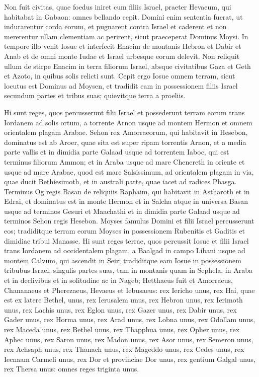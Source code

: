 \begin{biblechapter}
\verse Non fuit civitas, quae foedus iniret cum filiis Israel, praeter Hevaeum, qui habitabat in Gabaon: omnes bellando cepit. 
\verse Domini enim sententia fuerat, ut indurarentur corda eorum, et pugnarent contra Israel et caderent et non mererentur ullam clementiam ac perirent, sicut praeceperat Dominus Moysi. 
\verse In tempore illo venit Iosue et interfecit Enacim de montanis Hebron et Dabir et Anab et de omni monte Iudae et Israel urbesque eorum delevit. 
\verse Non reliquit ullum de stirpe Enacim in terra filiorum Israel, absque civitatibus Gaza et Geth et Azoto, in quibus solis relicti sunt. 
\verse Cepit ergo Iosue omnem terram, sicut locutus est Dominus ad Moysen, et tradidit eam in possessionem filiis Israel secundum partes et tribus suas; quievitque terra a proeliis. 
\end{biblechapter}

\begin{biblechapter}  
\verse Hi sunt reges, quos percusserunt filii Israel et possederunt terram eorum trans Iordanem ad solis ortum, a torrente Arnon usque ad montem Hermon et omnem orientalem plagam Arabae. 
\verse Sehon rex Amorraeorum, qui habitavit in Hesebon, dominatus est ab Aroer, quae sita est super ripam torrentis Arnon, et a media parte vallis et in dimidia parte Galaad usque ad torrentem Iaboc, qui est terminus filiorum Ammon; 
\verse et in Araba usque ad mare Chenereth in oriente et usque ad mare Arabae, quod est mare Salsissimum, ad orientalem plagam in via, quae ducit Bethiesimoth, et in australi parte, quae iacet ad radices Phasga. 
\verse Terminus Og regis Basan de reliquiis Raphaim, qui habitavit in Astharoth et in Edrai, 
\verse et dominatus est in monte Hermon et in Salcha atque in universa Basan usque ad terminos Gesuri et Maachathi et in dimidia parte Galaad usque ad terminos Sehon regis Hesebon. 
\verse Moyses famulus Domini et filii Israel percusserunt eos; tradiditque terram eorum Moyses in possessionem Rubenitis et Gaditis et dimidiae tribui Manasse. 
\verse Hi sunt reges terrae, quos percussit Iosue et filii Israel trans Iordanem ad occidentalem plagam, a Baalgad in campo Libani usque ad montem Calvum, qui ascendit in Seir; tradiditque eam Iosue in possessionem tribubus Israel, singulis partes suas, 
\verse tam in montanis quam in Sephela, in Araba et in declivibus et in solitudine ac in Nageb; Hetthaeus fuit et Amorraeus, Chananaeus et Pherezaeus, Hevaeus et Iebusaeus: 
\verse rex Iericho unus, rex Hai, quae est ex latere Bethel, unus, 
\verse rex Ierusalem unus, rex Hebron unus, 
\verse rex Ierimoth unus, rex Lachis unus, 
\verse rex Eglon unus, rex Gazer unus, 
\verse rex Dabir unus, rex Gader unus, 
\verse rex Horma unus, rex Arad unus, 
\verse rex Lobna unus, rex Odollam unus, 
\verse rex Maceda unus, rex Bethel unus, 
\verse rex Thapphua unus, rex Opher unus, 
\verse rex Aphec unus, rex Saron unus, 
\verse rex Madon unus, rex Asor unus,  
\verse rex Semeron unus, rex Achsaph unus, 
\verse rex Thanach unus, rex Mageddo unus, 
\verse rex Cedes unus, rex Iecnaam Carmeli unus, 
\verse rex Dor et provinciae Dor unus, rex gentium Galgal unus, 
\verse rex Thersa unus: omnes reges triginta unus. 
\end{biblechapter}

